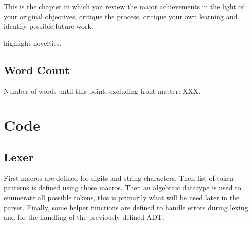\documentclass[12pt,a4paper]{report}
\theoremstyle{definition}
\theoremstyle{remark}
\begin{document}

This is the chapter in which you review the major achievements in the light of your original objectives, critique the process, critique your own learning and identify possible future work.

highlight novelties.

\vfill
\section{Word Count}
Number of words until this point, excluding front matter: XXX.



\appendix





\chapter{Code}

\section{Lexer}\label{appendix: lexer}
First macros are defined for digits and string characters. Then list of token patterns is defined using those macros. Then an algebraic datatype is used to enumerate all possible tokens, this is primarily what will be used later in the parser. Finally, some helper functions are defined to handle errors during lexing and for the handling of the previously defined ADT.
\end{document}
